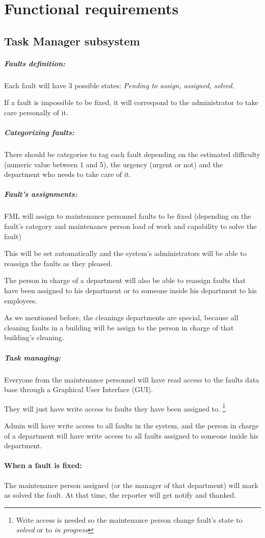 \section{Functional requirements}

\subsection{Task Manager subsystem}


\subparagraph{Faults definition: } Each fault will have 3 possible states: \textit{Pending to assign, assigned, solved}. 

If a fault is impossible to be fixed, it will correspond to the administrator to take care personally of it.


\subparagraph{Categorizing faults: } There should be categories to tag each fault depending on the estimated difficulty (numeric value between 1 and 5), the urgency (urgent or not) and the department who needs to take care of it.


\subparagraph{Fault's assignments: } FML will assign to maintenance personnel faults to be fixed (depending on the fault's category and maintenance person load of work and capability to solve the fault)

This will be set automatically and the system's administrators will be able to reassign the faults as they pleased.

The person in charge of a department will also be able to reassign faults that have been assigned to his department or to someone inside his department to his employees.

As we mentioned before, the cleanings departments are special, because all cleaning faults in a building will be assign to the person in charge of that building's cleaning.


\subparagraph{Task managing: } Everyone from the maintenance personnel will have read access to the faults data base through a Graphical User Interface (GUI). 

They will just have write access to faults they have been assigned to. \footnote{Write access is needed so the maintenance person change fault's state to \textit{solved} or to \textit{in progress}}

Admin will have write access to all faults in the system, and the person in charge of a department will have write access to all faults assigned to someone inside his department.


\paragraph{When a fault is fixed: } The maintenance person assigned (or the manager of that department) will mark as solved the fault. At that time, the reporter will get notify and thanked. 


